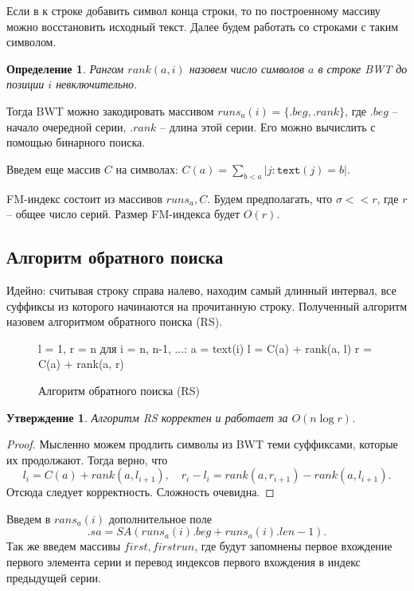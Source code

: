 \documentclass[10pt]{book}
\theoremstyle{plain}
\newtheorem{stm}{Утверждение}[section]
\newtheorem{definition}{Определение}[section]
\newcommand{\textm}{\texttt{text}}
\newenvironment{figurem}[1][]
  {\begin{figure}[p]
  \caption{#1}
  \centering
  }
  {
  \end{figure}
  }
\begin{document}
Если в к строке добавить символ конца строки, то по построенному массиву можно
восстановить исходный текст. Далее будем работать со строками с таким символом.

\begin{definition}
  Рангом $rank(a, i)$ назовем число символов $a$ в строке BWT до
  позиции $i$ невключительно.
\end{definition}

Тогда BWT можно закодировать массивом $runs_a(i) = \{.beg, .rank\}$, где 
$.beg$ -- начало очередной серии, $.rank$ -- длина этой серии. Его можно
вычислить с помощью бинарного поиска.

Введем еще массив $C$ на символах: $C(a) = \sum_{b < a} |j : \textm(j) = b|$.

FM-индекс состоит из массивов $runs_a, C$. Будем предполагать, что
$\sigma << r$, где $r$ -- общее число серий. Размер FM-индекса будет $O(r)$.

\subsection{Алгоритм обратного поиска}

Идейно: считывая строку справа налево, находим самый длинный интервал, все
суффиксы из которого начинаются на прочитанную строку. Полученный алгоритм
назовем алгоритмом обратного поиска (RS).

\begin{figurem}[Алгоритм обратного поиска (RS)]
\begin{verbm}
  l = 1, r = n
  для i = n, n-1, ...:
    a = text(i)
    l = C(a) + rank(a, l)
    r = C(a) + rank(a, r)
\end{verbm}
\end{figurem}

\begin{stm}
  Алгоритм RS корректен и работает за $O(n \log r)$.
\end{stm}
\begin{proof}
  Мысленно можем продлить символы из BWT теми суффиксами, которые их продолжают.
  Тогда верно, что 
  $$l_i = C(a) + rank(a, l_{i+1}), \quad r_i - l_i = rank(a, r_{i+1}) - rank(a, l_{i+1}).$$
  Отсюда следует корректность. Сложность очевидна.
\end{proof}

Введем в $rans_a(i)$ дополнительное поле 
$$.sa = SA(runs_a(i).beg + runs_a(i).len - 1).$$
Так же введем массивы $first, firstrun$, где будут запомнены первое вхождение
первого элемента серии и перевод индексов первого вхождения в индекс предыдущей
серии.
\end{document}
